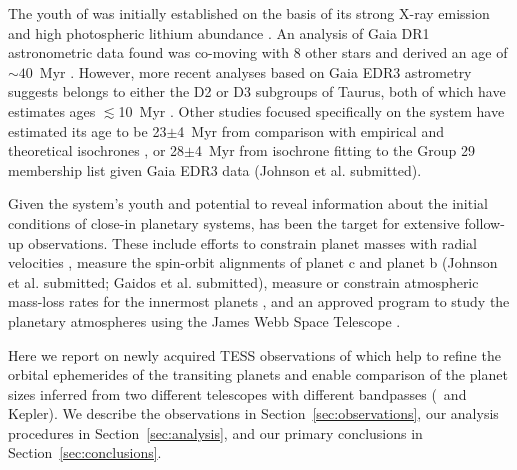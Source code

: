 \documentclass[twocolumn]{aastex631}
\begin{document}
The youth of \sname was initially established on the basis of its strong X-ray emission \citep{Wichmann1996} and high photospheric lithium abundance \citep{Wichmann2000}. An analysis of Gaia DR1 astronometric data found \sname was co-moving with 8 other stars \citep[Group 29;]{Oh2017} and derived an age of $\sim 40$~Myr \citep{Luhman2018}. However, more recent analyses based on Gaia EDR3 astrometry suggests \sname belongs to either the D2 or D3 subgroups of Taurus, both of which have estimates ages $\lesssim$10~Myr \citep[][Gaidos et al. submitted]{Krolikowski2021}. Other studies focused specifically on the \sname system have estimated its age to be 23$\pm$4~Myr from comparison with empirical and theoretical isochrones \citep{David2019b}, or 28$\pm$4~Myr from isochrone fitting to the \citet{Luhman2018} Group 29 membership list given Gaia EDR3 data (Johnson et al. submitted).


Given the system's youth and potential to reveal information about the initial conditions of close-in planetary systems, \sname has been the target for extensive follow-up observations. These include efforts to constrain planet masses with radial velocities \citep{Beichman2019}, measure the spin-orbit alignments of planet c \citep{Feinstein21} and planet b (Johnson et al. submitted; Gaidos et al. submitted), measure or constrain atmospheric mass-loss rates for the innermost planets \citep{Schlawin21, Vissapragada21}, and an approved program to study the planetary atmospheres using the James Webb Space Telescope \citep{Desert2021}.

Here we report on newly acquired TESS observations of \sname which help to refine the orbital ephemerides of the transiting planets and enable comparison of the planet sizes inferred from two different telescopes with different bandpasses (\tess\ and Kepler). We describe the observations in Section~\ref{sec:observations}, our analysis procedures in Section~\ref{sec:analysis}, and our primary conclusions in Section~\ref{sec:conclusions}.
\end{document}
